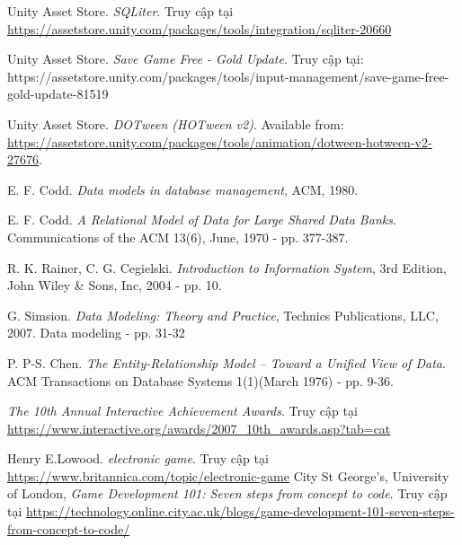 \begin{thebibliography}{1}
	 Unity Asset Store. \textit{SQLiter}. Truy cập tại \url{https://assetstore.unity.com/packages/tools/integration/sqliter-20660}

	
	Unity Asset Store. \textit{Save Game Free - Gold Update}. Truy cập tại: https://assetstore.unity.com/packages/tools/input-management/save-game-free-gold-update-81519
	
	Unity Asset Store. \textit{DOTween (HOTween v2)}. Available from: \url{https://assetstore.unity.com/packages/tools/animation/dotween-hotween-v2-27676}.
	
	 E. F. Codd. \textit{Data models in database management}, ACM, 1980. 
	
	 E. F. Codd. \textit{A Relational Model of Data for Large Shared Data Banks}. Communications of the ACM 13(6), June, 1970 - pp. 377-387.
	
	 R. K. Rainer, C. G. Cegielski. \textit{Introduction to Information System}, 3rd Edition, John Wiley \& Sons, Inc, 2004 - pp. 10.
	
	G. Simsion. \textit{Data Modeling: Theory and Practice}, Technics Publications, LLC, 2007. 
	Data modeling - pp. 31-32
	
	 P. P-S. Chen. \textit{The Entity-Relationship Model – Toward a Unified View of 
		Data}. ACM Transactions on Database Systems 1(1)(March 1976) - pp. 9-36. 
	
	 \textit {The 10th Annual Interactive Achievement Awards}. Truy cập tại \url{https://www.interactive.org/awards/2007_10th_awards.asp?tab=cat}
	
	 Henry E.Lowood. \textit{electronic game}. Truy cập tại \url{https://www.britannica.com/topic/electronic-game}
	 City St George’s, University of London, \textit{Game Development 101: Seven steps from concept to code}. Truy cập tại \url{https://technology.online.city.ac.uk/blogs/game-development-101-seven-steps-from-concept-to-code/}
\end{thebibliography}